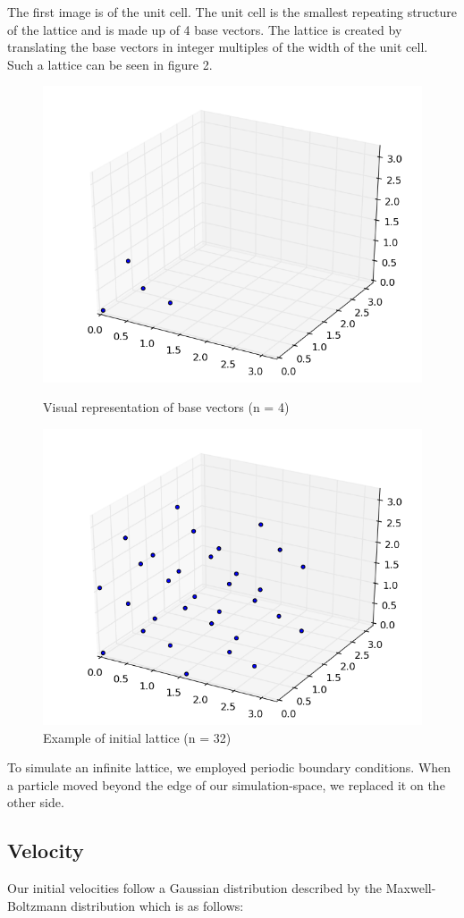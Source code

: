 \documentclass[10pt]{article}
\newcommand{\n}{\noindent}
\begin{document}
The first image is of the unit cell.  The unit cell is the smallest repeating structure of the lattice and is made up of 4 base vectors.  The lattice is created by translating the base vectors in integer multiples of the width of the unit cell.  Such a lattice can be seen in figure 2.

\begin{figure}[ht]
\centering
\begin{minipage}{.45\textwidth}
\centering
\includegraphics[width=0.5 \linewidth]{figures/Initial4.png}
\caption{Visual representation of base vectors (n = 4)}
\label{fig:figure1}
\end{minipage}\hfill
\quad	
\begin{minipage}{.45\textwidth}
\centering
\includegraphics[width=0.5 \linewidth]{figures/Initial32.png}
\caption{Example of initial lattice (n = 32)}
\label{fig:figure2}
\end{minipage}\hfill
\end{figure}
\n

To simulate an infinite lattice, we employed periodic boundary conditions.  When a particle moved beyond the edge of our simulation-space, we replaced it on the other side.

\subsection{Velocity}
Our initial velocities follow a Gaussian distribution described by the Maxwell-Boltzmann distribution which is as follows:
\end{document}
